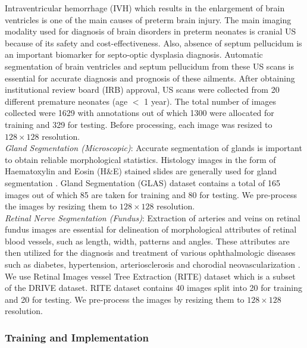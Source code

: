 \documentclass[journal,twoside,web]{ieeecolor}
\begin{document}
 Intraventricular hemorrhage (IVH) which results in the enlargement of brain ventricles is one of the main causes of preterm brain injury. The main imaging modality used for diagnosis of brain disorders in preterm neonates is cranial US because of its safety and cost-effectiveness. Also, absence of septum pellucidum is an important biomarker for septo-optic dysplasia diagnosis. Automatic segmentation of brain ventricles and septum pellucidum from these US scans is essential for accurate diagnosis and prognosis of these ailments. After obtaining institutional review board (IRB) approval, US scans were collected from 20 different premature neonates (age $<$ 1 year). The total number of images collected were 1629 with annotations out of which 1300 were allocated for training and 329 for testing. Before processing, each image was resized to $128 \times 128$  resolution.\\


\noindent\textit{Gland Segmentation (Microscopic)}:
 Accurate segmentation of glands is important to obtain reliable morphological statistics. Histology images in the form of Haematoxylin and Eosin (H$\&$E) stained slides are generally used for gland segmentation \cite{sirinukunwattana2017gland}. Gland Segmentation (GLAS) dataset contains a total of 165 images out of which 85 are taken for training and 80 for testing. We pre-process the images by resizing them to $128 \times 128$ resolution. \\


\noindent\textit{Retinal Nerve Segmentation (Fundus)}: 
Extraction of arteries and veins on retinal fundus images are essential for delineation of morphological attributes of retinal blood vessels, such as length, width, patterns and angles. These attributes are then utilized for the diagnosis and treatment of various ophthalmologic diseases such as diabetes, hypertension, arteriosclerosis and chorodial neovascularization \cite{staal2004ridge}. We use Retinal Images vessel Tree Extraction (RITE) dataset \cite{hu2013automated} which is  a subset of the DRIVE dataset.  RITE dataset contains 40 images split into 20 for training and 20 for testing. We pre-process the images by resizing them to $128 \times 128$ resolution.



\subsubsection{Training and Implementation}
\end{document}
